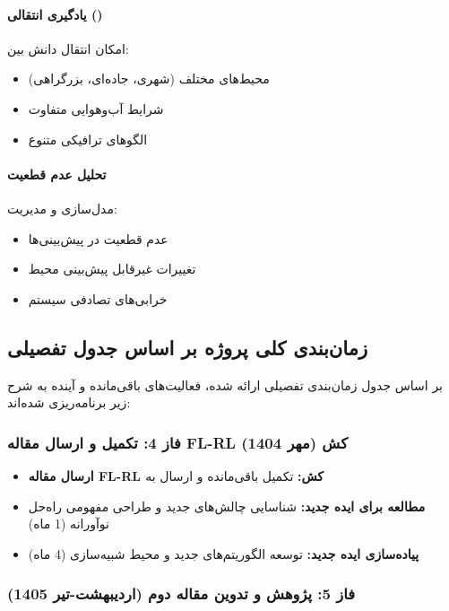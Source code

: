 \documentclass[11pt]{article}
\begin{document}
\paragraph{یادگیری انتقالی ()}
امکان انتقال دانش بین:
\begin{itemize}
\item محیط‌های مختلف (شهری، جاده‌ای، بزرگراهی)
\item شرایط آب‌وهوایی متفاوت
\item الگوهای ترافیکی متنوع
\end{itemize}

\paragraph{تحلیل عدم قطعیت}
مدل‌سازی و مدیریت:
\begin{itemize}
\item عدم قطعیت در پیش‌بینی‌ها
\item تغییرات غیرقابل پیش‌بینی محیط
\item خرابی‌های تصادفی سیستم
\end{itemize}

\subsection{زمان‌بندی کلی پروژه بر اساس جدول تفصیلی}

بر اساس جدول زمان‌بندی تفصیلی ارائه شده، فعالیت‌های باقی‌مانده و آینده به شرح زیر برنامه‌ریزی شده‌اند:

\subsubsection{فاز 4: تکمیل و ارسال مقاله FL-RL کش (مهر 1404)}

\begin{itemize}
\item \textbf{ارسال مقاله FL-RL کش:} تکمیل  باقی‌مانده و ارسال به 
\item \textbf{مطالعه برای ایده جدید:} شناسایی چالش‌های جدید و طراحی مفهومی راه‌حل نوآورانه (1 ماه)
\item \textbf{پیاده‌سازی ایده جدید:} توسعه الگوریتم‌های جدید و محیط شبیه‌سازی (4 ماه)
\end{itemize}

\subsubsection{فاز 5: پژوهش و تدوین مقاله دوم (اردیبهشت-تیر 1405)}
\end{document}
